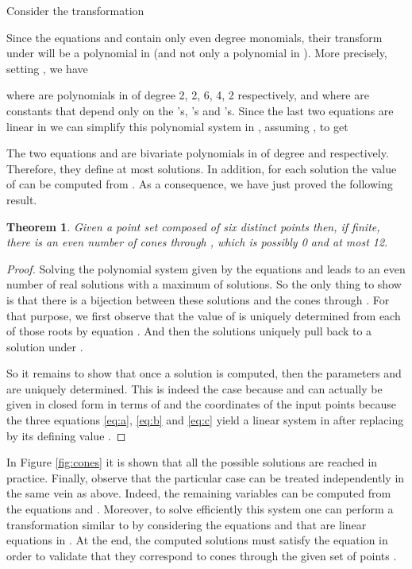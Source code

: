 \documentclass[5p]{elsarticle}
\newtheorem{thm}{Theorem}
\newcommand{\com}[1]{{\color{black} #1}}
\newcommand{\lb}[1]{{\color{black} #1}}
\begin{document}
Consider the transformation

Since the equations  and  \com{contain only} even degree monomials, their transform under  will be a polynomial in  (and not only a polynomial in ). More precisely, setting , we have

where  are polynomials in  of degree 2, 2, 6, 4, 2 respectively, and where  are \com{constants} that \com{depend only} on the 's, 's and 's. \com{Since} the \com{last two} equations are linear in  we can simplify this polynomial system \com{in }, assuming , to get 

The two equations  and  are bivariate polynomials in  of degree  and  respectively. Therefore, they define at most  solutions. In addition, for each solution the value of  can be computed from . As a consequence, we have just proved the following result.

\begin{thm}\label{thm:12cones}
	 \com{Given} a point set  composed of six distinct points \com{then}, if finite, there is an even number of cones through , which is possibly 0 and at most 12.
\end{thm}
\begin{proof} \com{Solving} the polynomial system \com{given by the equations  and } leads to an even number of real solutions with a maximum of  solutions. So the only thing to show is that there is a bijection between these solutions and the cones through . For that purpose, we first observe that the value of  is uniquely determined from each of those roots by equation . And then the solutions \com{ uniquely \lb{pull back}} to a solution  under . 
	
	\com{So} it remains to show that once a solution  is computed, then the parameters  and  are uniquely determined. This is indeed the case because  and  can \com{actually be given} in closed form in terms of  and the coordinates of the input \com{points because} the three equations \eqref{eq:a}, \eqref{eq:b} and \eqref{eq:c} \com{yield} a linear system in  after replacing  by its defining value .
\end{proof}

In Figure \ref{fig:cones} it is shown that all the \com{possible solutions} are reached in practice. Finally, observe that the particular case  can be treated independently in the same \com{vein} as above. Indeed, the remaining variables  can be computed from the equations  and . Moreover, to solve efficiently this system one can perform a transformation similar to  by considering the equations  and  that are linear equations in . At the end, the computed solutions \com{must satisfy} the equation  in order to validate that they correspond to cones through the given set of points .   
\end{document}
